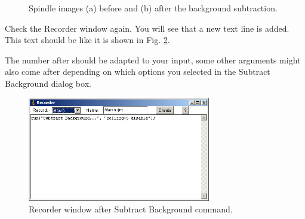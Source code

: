 \begin{indentexercise}{1}
\begin{figure}[htbp]
 \centering
 \caption{ Spindle images (a) before and (b) after the
background subtraction.}
 \label{fig:spindleBacksubtraction}
\end{figure} 


Check the Recorder window again. You will see that a new text line is
added. This text should be like it is shown in Fig. \ref{fig:img73}.

\begin{quote}
\end{quote}

The number after  should be adapted
 to your input, some other arguments might also come after depending on which options you selected in the Subtract Background dialog box. 
\begin{figure}[htbp]
\begin{center}
\includegraphics[width=8cm]{fig/CMCIBasicCourse201102-img73.png}
\caption{ Recorder window after Subtract Background command.}
\label{fig:img73}
\end{center}
\end{figure}


\end{indentexercise}
